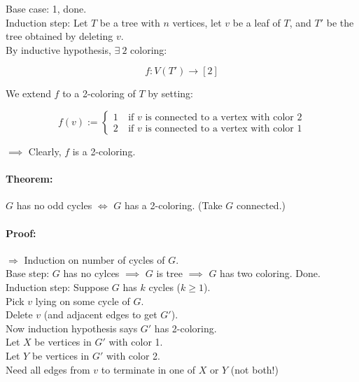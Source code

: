 \documentclass[a4paper, 11pt, twoside]{article}
\begin{document}
Base case: 1, done.\\

Induction step: Let $T$ be a tree with $n$ vertices, let $v$ be a leaf of $T$, and $T'$ be the tree obtained by deleting $v$.\\

By inductive hypothesis, $\exists\ 2$ coloring:

\[f:V(T')\longrightarrow [2]\]

We extend $f$ to a 2-coloring of $T$ by setting:

\[f(v):=\begin{cases}1\ &\text{if $v$ is connected to a vertex with color 2}\\
2\ &\text{if $v$ is connected to a vertex with color 1}	
\end{cases}
\]

$\implies$ Clearly, $f$ is a 2-coloring.

\paragraph{Theorem:} $G$ has no odd cycles $\iff$ $G$ has a 2-coloring. (Take $G$ connected.)

\paragraph{Proof:} $\Longrightarrow$ Induction on number of cycles of $G$.\\

Base step: $G$ has no cylces $\implies$ $G$ is tree $\implies$ $G$ has two coloring. Done.\\

Induction step: Suppose $G$ has $k$ cycles ($k\geq 1$).\\

Pick $v$ lying on some cycle of $G$.\\

Delete $v$ (and adjacent edges to get $G'$).\\

Now induction hypothesis says $G'$ has 2-coloring.\\

Let $X$ be vertices in $G'$ with color 1.\\

Let $Y$ be vertices in $G'$ with color 2.\\

Need all edges from $v$ to terminate in one of $X$ or $Y$ (not both!)\\
\end{document}
